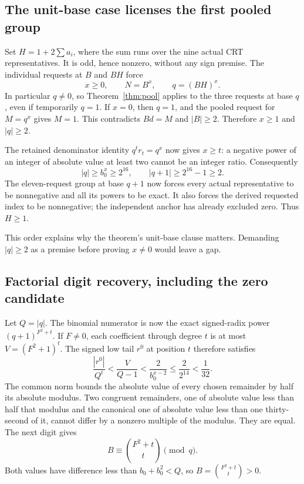 \documentclass[11pt,letterpaper]{article}
\theoremstyle{definition}\newtheorem{definition}[theorem]{Definition}
\theoremstyle{remark}\newtheorem{remark}[theorem]{Remark}
\begin{document}
\subsection{The unit-base case licenses the first pooled group}

Set \(H=1+2\sum a_i\), where the sum runs over the nine actual CRT
representatives. It is odd, hence nonzero, without any sign premise.
The individual requests at \(B\) and \(BH\) force
\[
x\ge0,\qquad N=B^x,\qquad q=(BH)^x.
\]
In particular \(q\ne0\), so Theorem~\ref{thm:pool} applies to the
three requests at base \(q\), even if temporarily \(q=1\).
If \(x=0\), then \(q=1\), and the pooled request for \(M=q^x\)
gives \(M=1\). This contradicts \(Bd=M\) and \(|B|\ge2\).
Therefore \(x\ge1\) and \(|q|\ge2\).

The retained denominator identity \(q^t r_t=q^x\) now gives
\(x\ge t\): a negative power of an integer of absolute value at least
two cannot be an integer ratio. Consequently
\[
|q|\ge b_0^x\ge2^{16},\qquad |q+1|\ge2^{16}-1\ge2.
\]
The eleven-request group at base \(q+1\) now forces every actual
representative to be nonnegative and all its powers to be exact. It also
forces the derived requested index to be nonnegative; the independent
anchor has already excluded zero. Thus \(H\ge1\).

This order explains why the theorem's unit-base clause matters. Demanding
\(|q|\ge2\) as a premise before proving \(x\ne0\) would leave a gap.

\subsection{Factorial digit recovery, including the zero candidate}

Let \(Q=|q|\). The binomial numerator is now the exact signed-radix
power \((q+1)^{F^2+t}\). If \(F\ne0\), each coefficient through degree
\(t\) is at most \(V=(F^2+1)^t\). The signed low tail \(r^0\) at
position \(t\) therefore satisfies
\[
\frac{|r^0|}{Q^t}<\frac{V}{Q-1}
 <\frac{2}{b_0^{x-2}}\le\frac{2}{2^{14}}<\frac1{32}.
\]
The common norm bounds the absolute value of every chosen remainder by
half its absolute modulus. Two congruent remainders, one of absolute
value less than half that modulus and the canonical one of absolute
value less than one thirty-second of it, cannot differ by a nonzero
multiple of the modulus.
They are equal. The next digit gives
\[
B\equiv\binom{F^2+t}{t}\pmod q.
\]
Both values have difference less than
\(b_0+b_0^2<Q\), so \(B=\binom{F^2+t}{t}>0\).
\end{document}
